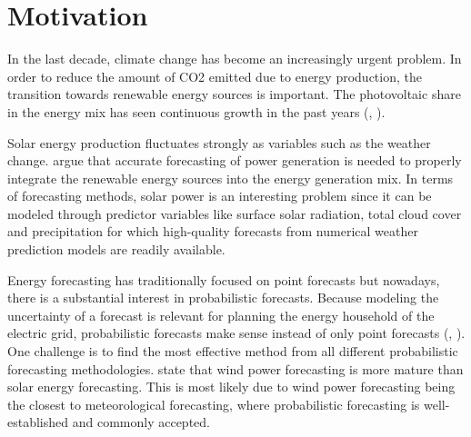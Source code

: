 \section{Motivation}
\label{sec:motivation}


In the last decade, climate change has become an increasingly urgent problem. 
In order to reduce the amount of CO2 emitted due to energy production, 
the transition towards renewable energy sources is important. 
The photovoltaic share in the energy mix has seen continuous growth in 
the past years (\citeauthor{Snapshot2016}, ). 

Solar energy production fluctuates strongly as variables such as the weather change. 
\Textcite{Meer2018} argue that accurate forecasting of power generation is needed to properly 
integrate the renewable energy sources into the energy generation mix. 
In terms of forecasting methods, solar power is 
an interesting problem since it can be modeled through predictor variables 
like surface solar radiation, total cloud cover and precipitation 
for which high-quality forecasts from numerical weather prediction models are readily available. 


Energy forecasting has traditionally focused on point forecasts 
but nowadays, there is a substantial interest in probabilistic forecasts.
Because modeling the uncertainty of a forecast is relevant for planning the energy household of the electric grid, 
probabilistic forecasts make sense instead of only point forecasts (\citeauthor{Meer2018}, ). 
One challenge is to find the most effective method from all different probabilistic forecasting methodologies. 
\Textcite{Hong2016} state that wind power forecasting is 
more mature than solar energy forecasting.
This is most likely due to 
wind power forecasting being the closest to meteorological forecasting, 
where probabilistic forecasting is well-established and commonly accepted. 


